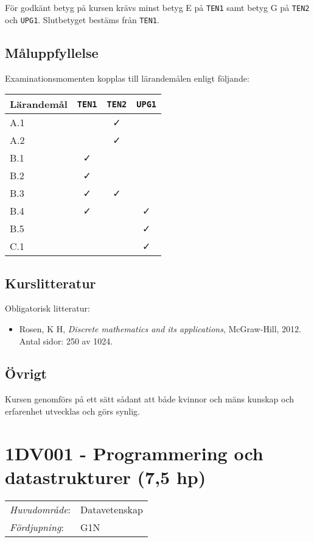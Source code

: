 För godkänt betyg på kursen krävs minst betyg E på \texttt{TEN1} samt betyg G på
\texttt{TEN2} och \texttt{UPG1}. Slutbetyget bestäms från \texttt{TEN1}.

\subsection*{Måluppfyllelse}

Examinationsmomenten kopplas till lärandemålen enligt följande:

\begin{longtable}[]{@{}lccc@{}}
\toprule
\textsf{Lärandemål} & \texttt{TEN1} & \texttt{TEN2} & \texttt{UPG1}\tabularnewline
\midrule
\endhead
A.1 & & \faCheck &\tabularnewline
A.2 & & \faCheck &\tabularnewline
B.1 & \faCheck & &\tabularnewline
B.2 & \faCheck & &\tabularnewline
B.3 & \faCheck & \faCheck &\tabularnewline
B.4 & \faCheck & & \faCheck\tabularnewline
B.5 & & & \faCheck\tabularnewline
C.1 & & & \faCheck\tabularnewline
\bottomrule
\end{longtable}

\subsection*{Kurslitteratur}

Obligatorisk litteratur:

\begin{itemize}
\tightlist
\item
  Rosen, K H, \emph{Discrete mathematics and its applications},
  McGraw-Hill, 2012. Antal sidor: 250 av 1024.
\end{itemize}

\subsection*{Övrigt}

Kursen genomförs på ett sätt sådant att både kvinnor och mäns kunskap och erfarenhet utvecklas och görs synlig.
\pagebreak

\section*{1DV001 - Programmering och datastrukturer (7,5 hp)}

\begin{tabular}{ll}\emph{Huvudområde}: & Datavetenskap\tabularnewline\emph{Fördjupning}: & G1N\tabularnewline\end{tabular}

